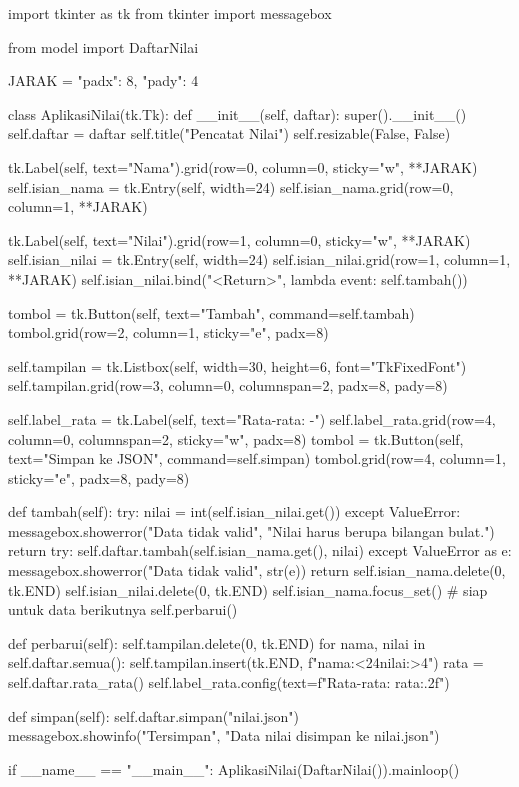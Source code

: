 \begin{kode}[gui.py]
import tkinter as tk
from tkinter import messagebox

from model import DaftarNilai

JARAK = {"padx": 8, "pady": 4}

class AplikasiNilai(tk.Tk):
    def __init__(self, daftar):
        super().__init__()
        self.daftar = daftar
        self.title("Pencatat Nilai")
        self.resizable(False, False)

        tk.Label(self, text="Nama").grid(row=0, column=0, sticky="w", **JARAK)
        self.isian_nama = tk.Entry(self, width=24)
        self.isian_nama.grid(row=0, column=1, **JARAK)

        tk.Label(self, text="Nilai").grid(row=1, column=0, sticky="w",
                                          **JARAK)
        self.isian_nilai = tk.Entry(self, width=24)
        self.isian_nilai.grid(row=1, column=1, **JARAK)
        self.isian_nilai.bind("<Return>", lambda event: self.tambah())

        tombol = tk.Button(self, text="Tambah", command=self.tambah)
        tombol.grid(row=2, column=1, sticky="e", padx=8)

        self.tampilan = tk.Listbox(self, width=30, height=6,
                                   font="TkFixedFont")
        self.tampilan.grid(row=3, column=0, columnspan=2, padx=8, pady=8)

        self.label_rata = tk.Label(self, text="Rata-rata: -")
        self.label_rata.grid(row=4, column=0, columnspan=2, sticky="w",
                             padx=8)
        tombol = tk.Button(self, text="Simpan ke JSON", command=self.simpan)
        tombol.grid(row=4, column=1, sticky="e", padx=8, pady=8)

    def tambah(self):
        try:
            nilai = int(self.isian_nilai.get())
        except ValueError:
            messagebox.showerror("Data tidak valid",
                                 "Nilai harus berupa bilangan bulat.")
            return
        try:
            self.daftar.tambah(self.isian_nama.get(), nilai)
        except ValueError as e:
            messagebox.showerror("Data tidak valid", str(e))
            return
        self.isian_nama.delete(0, tk.END)
        self.isian_nilai.delete(0, tk.END)
        self.isian_nama.focus_set()          # siap untuk data berikutnya
        self.perbarui()

    def perbarui(self):
        self.tampilan.delete(0, tk.END)
        for nama, nilai in self.daftar.semua():
            self.tampilan.insert(tk.END, f"{nama:<24}{nilai:>4}")
        rata = self.daftar.rata_rata()
        self.label_rata.config(text=f"Rata-rata: {rata:.2f}")

    def simpan(self):
        self.daftar.simpan("nilai.json")
        messagebox.showinfo("Tersimpan", "Data nilai disimpan ke nilai.json")

if __name__ == "__main__":
    AplikasiNilai(DaftarNilai()).mainloop()
\end{kode}

